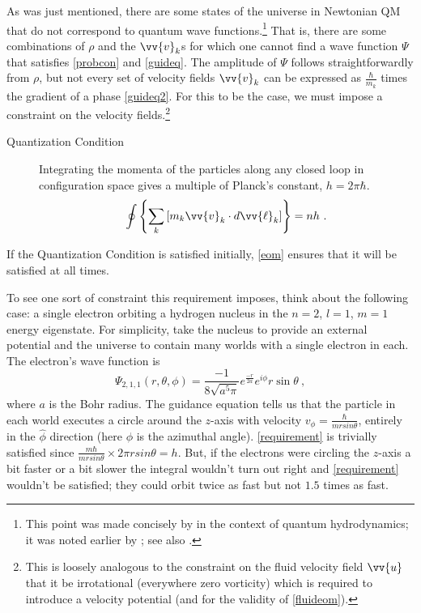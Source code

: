 \documentclass[onecolumn,secnumarabic,balancelastpage,amsmath,amssymb,nofootinbib]{article}
\begin{document}
As was just mentioned, there are some states of the universe in Newtonian QM that do not correspond to quantum wave functions.\footnote{This point was made concisely by \citet{wallstrom1994} in the context of quantum hydrodynamics; it was noted earlier by \citet{takabayasi1952}; see also \citet[][eq. 4.14]{holland2005}.}  That is, there are some combinations of $\rho$ and the $\vv{v}_k$s for which one cannot find a wave function $\Psi$ that satisfies \eqref{probcon} and \eqref{guideq}.  The amplitude of $\Psi$ follows straightforwardly from $\rho$, but not every set of velocity fields $\vv{v}_k$ can be expressed as $\frac{\hbar}{m_k}$ times the gradient of a phase \eqref{guideq2}.  For this to be the case, we must impose a constraint on the velocity fields.\footnote{This is loosely analogous to the constraint on the fluid velocity field $\vv{u}$ that it be irrotational (everywhere zero vorticity) which is required to introduce a velocity potential (and for the validity of \eqref{fluideom}).}
\begin{description}
\item[Quantization Condition]  Integrating the momenta of the particles along any closed loop in configuration space gives a multiple of Planck's constant, $h=2\pi\hbar$.
\begin{equation}
\oint{\left\{\sum_k{\left[m_k\vv{v}_k \cdot d\vv{\ell}_k\right]}\right\}}=nh\ .
\label{requirement}
\end{equation}
\end{description}
If the Quantization Condition is satisfied initially, \eqref{eom} ensures that it will be satisfied at all times.

To see one sort of constraint this requirement imposes, think about the following case: a single electron orbiting a hydrogen nucleus in the $n=2$, $l=1$, $m=1$ energy eigenstate.  For simplicity, take the nucleus to provide an external potential and the universe to contain many worlds with a single electron in each.  The electron's wave function is
\begin{equation}
\Psi_{2,1,1}(r,\theta,\phi)=\frac{-1}{8 \sqrt{a^5 \pi}}e^{\frac{-r}{2a}}e^{i\phi}r\sin \theta\ ,
\label{circlingelectrons}
\end{equation}
where $a$ is the Bohr radius.  The guidance equation tells us that the particle in each world executes a circle around the $z$-axis with velocity $v_{\phi}=\frac{\hbar}{m r sin{\theta}}$, entirely in the $\widehat{\phi}$ direction (here $\phi$ is the azimuthal angle).  \eqref{requirement} is trivially satisfied since $\frac{m \hbar}{m r sin{\theta}} \times 2 \pi r sin{\theta}=h$.  But, if the electrons were circling the $z$-axis a bit faster or a bit slower the integral wouldn't turn out right and \eqref{requirement} wouldn't be satisfied; they could orbit twice as fast but not $1.5$ times as fast.
\end{document}

